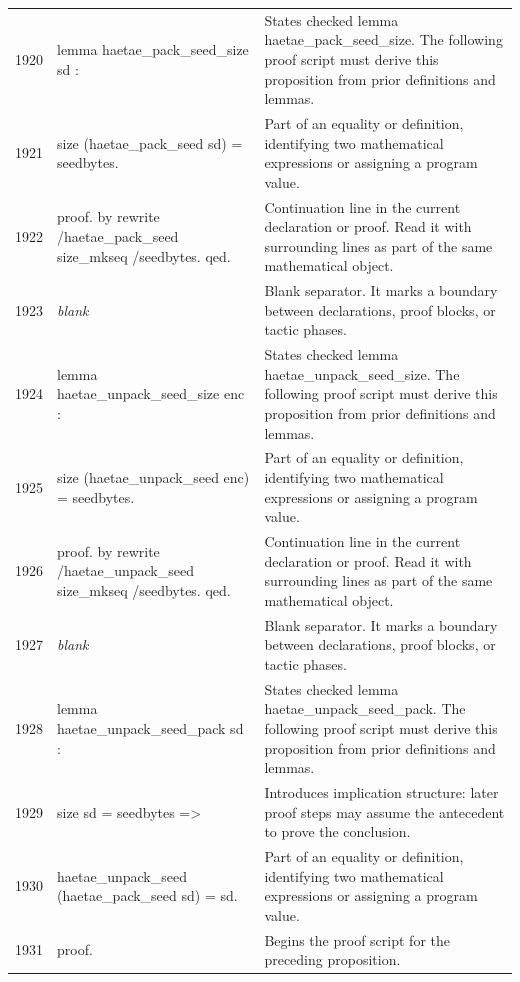 \documentclass[10pt]{article}
\begin{document}
\begin{longtable}{r L{0.53\textwidth} L{0.37\textwidth}}
1920 & {\ttfamily\scriptsize lemma haetae\_pack\_seed\_size sd :} & States checked lemma haetae\_pack\_seed\_size.  The following proof script must derive this proposition from prior definitions and lemmas. \\
1921 & {\ttfamily\scriptsize   size (haetae\_pack\_seed sd) = seedbytes.} & Part of an equality or definition, identifying two mathematical expressions or assigning a program value. \\
1922 & {\ttfamily\scriptsize proof. by rewrite /haetae\_pack\_seed size\_mkseq /seedbytes. qed.} & Continuation line in the current declaration or proof.  Read it with surrounding lines as part of the same mathematical object. \\
1923 & {\ttfamily\scriptsize \emph{blank}} & Blank separator.  It marks a boundary between declarations, proof blocks, or tactic phases. \\
1924 & {\ttfamily\scriptsize lemma haetae\_unpack\_seed\_size enc :} & States checked lemma haetae\_unpack\_seed\_size.  The following proof script must derive this proposition from prior definitions and lemmas. \\
1925 & {\ttfamily\scriptsize   size (haetae\_unpack\_seed enc) = seedbytes.} & Part of an equality or definition, identifying two mathematical expressions or assigning a program value. \\
1926 & {\ttfamily\scriptsize proof. by rewrite /haetae\_unpack\_seed size\_mkseq /seedbytes. qed.} & Continuation line in the current declaration or proof.  Read it with surrounding lines as part of the same mathematical object. \\
1927 & {\ttfamily\scriptsize \emph{blank}} & Blank separator.  It marks a boundary between declarations, proof blocks, or tactic phases. \\
1928 & {\ttfamily\scriptsize lemma haetae\_unpack\_seed\_pack sd :} & States checked lemma haetae\_unpack\_seed\_pack.  The following proof script must derive this proposition from prior definitions and lemmas. \\
1929 & {\ttfamily\scriptsize   size sd = seedbytes =>} & Introduces implication structure: later proof steps may assume the antecedent to prove the conclusion. \\
1930 & {\ttfamily\scriptsize   haetae\_unpack\_seed (haetae\_pack\_seed sd) = sd.} & Part of an equality or definition, identifying two mathematical expressions or assigning a program value. \\
1931 & {\ttfamily\scriptsize proof.} & Begins the proof script for the preceding proposition. \\

\end{longtable}
\end{document}
